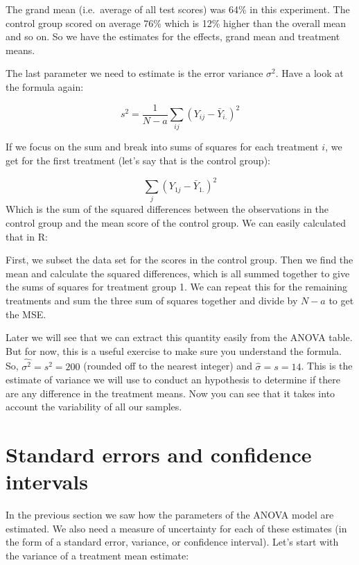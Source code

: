 \documentclass[
  letterpaper,
]{book}
\begin{document}
The grand mean (i.e.~average of all test scores) was 64\% in this
experiment. The control group scored on average 76\% which is 12\%
higher than the overall mean and so on. So we have the estimates for the
effects, grand mean and treatment means.

The last parameter we need to estimate is the error variance
\(\sigma^2\). Have a look at the formula again:

\[ s^2 = \frac{1}{N-a}\sum_{ij}(Y_{ij} - \bar{Y}_{i.})^2 \]

If we focus on the sum and break into sums of squares for each treatment
\(i\), we get for the first treatment (let's say that is the control
group):

\[ \sum_{j}(Y_{1j} - \bar{Y}_{1.})^2 \] Which is the sum of the squared
differences between the observations in the control group and the mean
score of the control group. We can easily calculated that in R:

First, we subset the data set for the scores in the control group. Then
we find the mean and calculate the squared differences, which is all
summed together to give the sums of squares for treatment group 1. We
can repeat this for the remaining treatments and sum the three sum of
squares together and divide by \(N-a\) to get the MSE.

Later we will see that we can extract this quantity easily from the
ANOVA table. But for now, this is a useful exercise to make sure you
understand the formula. So, \(\hat{\sigma^2} = s^2 = 200\) (rounded off
to the nearest integer) and \(\hat{\sigma} = s = 14\). This is the
estimate of variance we will use to conduct an hypothesis to determine
if there are any difference in the treatment means. Now you can see that
it takes into account the variability of all our samples.

\section{Standard errors and confidence
intervals}\label{standard-errors-and-confidence-intervals}

In the previous section we saw how the parameters of the ANOVA model are
estimated. We also need a measure of uncertainty for each of these
estimates (in the form of a standard error, variance, or confidence
interval). Let's start with the variance of a treatment mean estimate:

\end{document}
